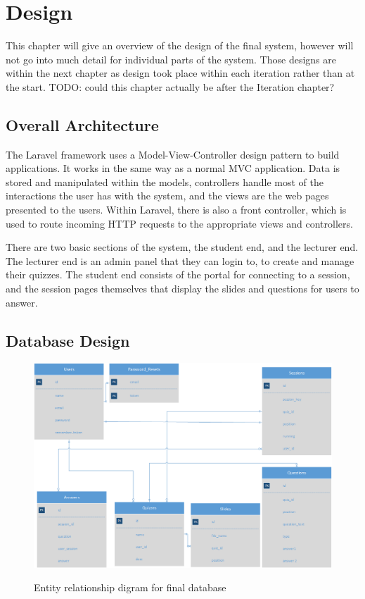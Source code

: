 \chapter{Design}
This chapter will give an overview of the design of the final system, however will not go into much detail for individual parts of the system. Those designs are within the next chapter as design took place within each iteration rather than at the start.
TODO: could this chapter actually be after the Iteration chapter?

\section{Overall Architecture}
The Laravel framework uses a Model-View-Controller design pattern to build applications. It works in the same way as a normal MVC application. Data is stored and manipulated within the models, controllers handle most of the interactions the user has with the system, and the views are the web pages presented to the users. Within Laravel, there is also a front controller, which is used to route incoming HTTP requests to the appropriate views and controllers.

There are two basic sections of the system, the student end, and the lecturer end. The lecturer end is an admin panel that they can login to, to create and manage their quizzes. The student end consists of the portal for connecting to a session, and the session pages themselves that display the slides and questions for users to answer.

\section{Database Design}
\begin{figure}
	\caption{Entity relationship digram for final database}
	\includegraphics[width=\textwidth]{Chapter2/Final-ER-Image}
	\label{fig:er-diagram}
\end{figure}
\newpage

